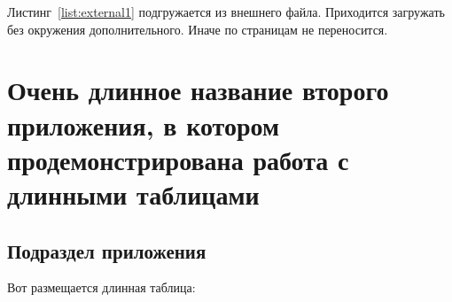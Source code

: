 Листинг~\ref{list:external1} подгружается из внешнего файла. Приходится загружать без окружения дополнительного. Иначе по страницам не переносится.
    






\chapter{Очень длинное название второго приложения, в котором продемонстрирована работа с длинными таблицами} \label{AppendixB}

 \section{Подраздел приложения}\label{AppendixB1}
Вот размещается длинная таблица:
\fontsize{10pt}{10pt}\selectfont
